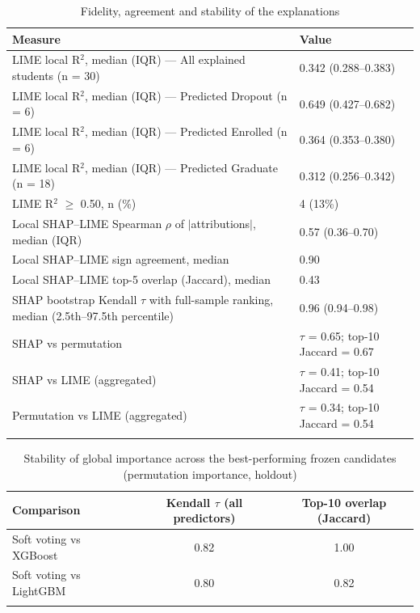 \begin{table}[!htbp]
\caption{Fidelity, agreement and stability of the explanations}\label{tab:TableS7_explanation_quality}
\small
\begin{tabular*}{\textwidth}{@{\extracolsep\fill}@{}ll@{}}
\toprule
Measure & Value \\
\midrule
LIME local R$^{2}$, median (IQR) --- All explained students (n = 30) & 0.342 (0.288--0.383) \\
LIME local R$^{2}$, median (IQR) --- Predicted Dropout (n = 6) & 0.649 (0.427--0.682) \\
LIME local R$^{2}$, median (IQR) --- Predicted Enrolled (n = 6) & 0.364 (0.353--0.380) \\
LIME local R$^{2}$, median (IQR) --- Predicted Graduate (n = 18) & 0.312 (0.256--0.342) \\
LIME R$^{2}$ $\geq$ 0.50, n (\%) & 4 (13\%) \\
Local SHAP--LIME Spearman $\rho$ of $|$attributions$|$, median (IQR) & 0.57 (0.36--0.70) \\
Local SHAP--LIME sign agreement, median & 0.90 \\
Local SHAP--LIME top-5 overlap (Jaccard), median & 0.43 \\
SHAP bootstrap Kendall $\tau$ with full-sample ranking, median (2.5th--97.5th percentile) & 0.96 (0.94--0.98) \\
SHAP vs permutation & $\tau$ = 0.65; top-10 Jaccard = 0.67 \\
SHAP vs LIME (aggregated) & $\tau$ = 0.41; top-10 Jaccard = 0.54 \\
Permutation vs LIME (aggregated) & $\tau$ = 0.34; top-10 Jaccard = 0.54 \\
\botrule
\end{tabular*}
\end{table}

\begin{table}[!htbp]
\caption{Stability of global importance across the best-performing frozen candidates (permutation importance, holdout)}\label{tab:TableS8_cross_model_stability}
\small
\begin{tabular*}{\textwidth}{@{\extracolsep\fill}@{}lcc@{}}
\toprule
Comparison & Kendall $\tau$ (all predictors) & Top-10 overlap (Jaccard) \\
\midrule
Soft voting vs XGBoost & 0.82 & 1.00 \\
Soft voting vs LightGBM & 0.80 & 0.82 \\
\botrule
\end{tabular*}
\end{table}

